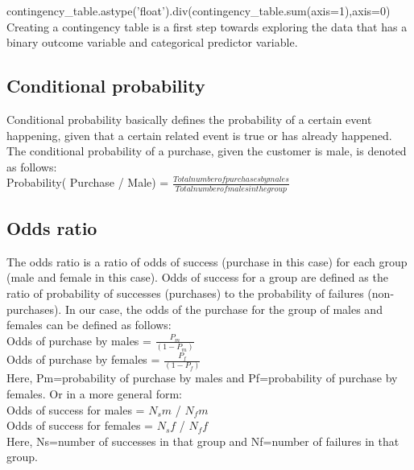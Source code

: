 \documentclass{article}
\numberwithin{equation}{section} %
\begin{document}
contingency\_table.astype('float').div(contingency\_table.sum(axis=1),axis=0) \\


Creating a contingency table is a first step towards exploring the data that has a
binary outcome variable and categorical predictor variable. \\

\subsection*{Conditional probability}

Conditional probability basically defines the probability of a certain event happening, given that a certain related event is true or has already happened. The conditional probability of a purchase, given the customer is male, is denoted as follows: \\

Probability( Purchase / Male) = $\frac{Total number of purchases by males
}{Total number of males in the group}$


\subsection*{Odds ratio}

The odds ratio is a ratio of odds of success (purchase in this case) for each group
(male and female in this case). Odds of success for a group are defined as the ratio of probability of successes (purchases) to the probability of failures (non-purchases). In our case, the odds of the purchase for the group of males and females can be defined as follows: \\

Odds of purchase by males = $\frac{P_m}{(1 - P_m )}$ \\

Odds of purchase by females =  $\frac{P_f}{(1-P_f)}$ \\

Here, Pm=probability of purchase by males and Pf=probability of purchase by females. Or in a more general form: \\

Odds of success for males = $N_sm$ / $N_fm$ \\

Odds of success for females = $N_sf$ / $N_ff$ \\

Here, Ns=number of successes in that group and Nf=number of failures in that group. 
\end{document}
